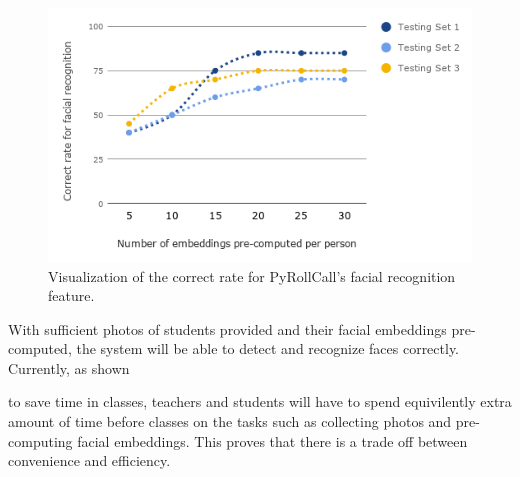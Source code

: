 \begin{figure}[!htb]
  \centering
  \includegraphics[width=0.85\linewidth]{figures/exp-result-chart.png}
  \caption{Visualization of the correct rate for PyRollCall's facial recognition feature.}
  \label{fig:exp-result-chart}
\end{figure}
\clearpage


With sufficient photos of students provided and their facial embeddings pre-computed,
the system will be able to detect and recognize faces correctly. Currently, as shown

to save time
in classes, teachers and students will have to spend equivilently extra amount of time
before classes on the tasks such as collecting photos and pre-computing facial embeddings.
This proves that there is a trade off between convenience and efficiency.
\vspace{0.2cm}

